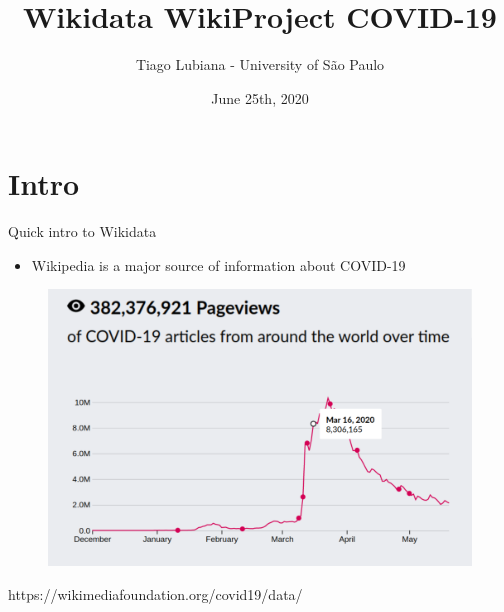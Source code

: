 \documentclass{beamer}
\title[Wikidata WikiProject COVID-19]{Wikidata WikiProject COVID-19}
\author[User:TiagoLubiana]{Tiago Lubiana - University of São Paulo}
\date[25/06/2020]{June 25th, 2020}
\begin{document}
\begin{frame}
  \titlepage
\end{frame}



\section{Intro}


\begin{frame}{Quick intro to Wikidata}

\begin{itemize}
    \item Wikipedia is a major source of information about COVID-19

\end{itemize}

\begin{figure}
\includegraphics[scale=0.45]{fig/wikipedia_access_covid_19.png}
\end{figure}

 https://wikimediafoundation.org/covid19/data/
 
\end{frame}
\end{document}
